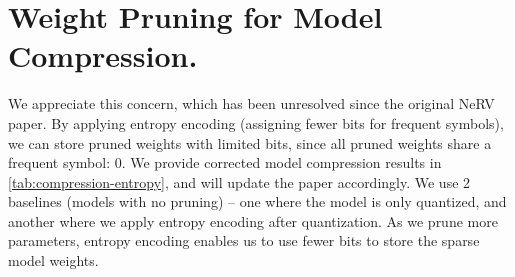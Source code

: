 \documentclass[10pt,twocolumn,letterpaper]{article}
\begin{document}
\section{Weight Pruning for Model Compression.}
We appreciate this concern, which has been unresolved since the original NeRV paper.
By applying entropy encoding (assigning fewer bits for frequent symbols), we can store pruned weights with limited bits, since all pruned weights share a frequent symbol: $0$.
We provide corrected model compression results in  \cref{tab:compression-entropy}, and will update the paper accordingly.
We use 2 baselines (models with no pruning) -- one where the model is only quantized, and another where we apply entropy encoding after quantization.
As we prune more parameters, entropy encoding enables us to use fewer bits to store the sparse model weights.

\begin{table}[h]
\centering
\vspace{-1em}
\caption{Compression results. 
``Size ratio'' compares to model with quant. only, and ``Sparsity'' indicates amount of weights pruned. }
\label{tab:compression-entropy}
\vspace{-0.8em}
\end{table}
\end{document}
